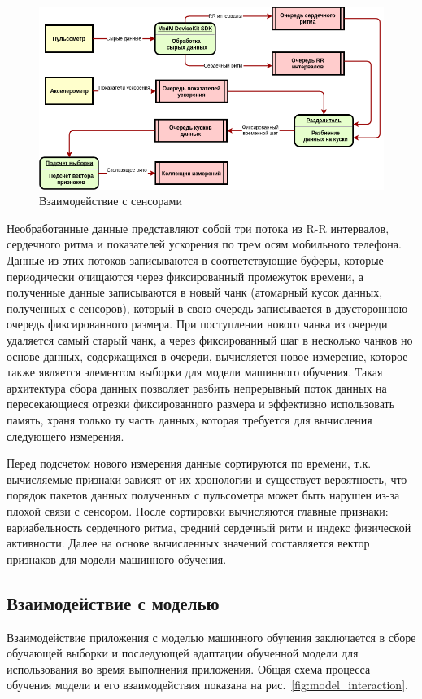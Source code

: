 \documentclass[14pt]{matmex-diploma-custom}
\begin{document}
\begin{figure}[ht]
  \centering \includegraphics[width=\textwidth]{images/sensors_interaction.png}
  \caption{Взаимодействие с сенсорами}
  \label{fig:sensors_interaction}
\end{figure}

Необработанные данные представляют собой три потока из R-R интервалов,
сердечного ритма и показателей ускорения по трем осям мобильного телефона.
Данные из этих потоков записываются в соответствующие буферы, которые
периодически очищаются через фиксированный промежуток времени, а полученные
данные записываются в новый чанк (атомарный кусок данных, полученных с
сенсоров), который в свою очередь записывается в двустороннюю очередь
фиксированного размера. При поступлении нового чанка из очереди удаляется самый
старый чанк, а через фиксированный шаг в несколько чанков но основе данных,
содержащихся в очереди, вычисляется новое измерение, которое также является
элементом выборки для модели машинного обучения. Такая архитектура сбора данных
позволяет разбить непрерывный поток данных на пересекающиеся отрезки
фиксированного размера и эффективно использовать память, храня только ту часть
данных, которая требуется для вычисления следующего измерения.

Перед подсчетом нового измерения данные сортируются по времени, т.к. вычисляемые
признаки зависят от их хронологии и существует вероятность, что порядок пакетов
данных полученных с пульсометра может быть нарушен из-за плохой связи с
сенсором. После сортировки вычисляются главные признаки: вариабельность
сердечного ритма, средний сердечный ритм и индекс физической активности. Далее
на основе вычисленных значений составляется вектор признаков для модели
машинного обучения.

\subsection{Взаимодействие с моделью}
Взаимодействие приложения с моделью машинного обучения заключается в сборе
обучающей выборки и последующей адаптации обученной модели для использования во
время выполнения приложения. Общая схема процесса обучения модели и его
взаимодействия показана на рис.~\ref{fig:model_interaction}.
\end{document}
